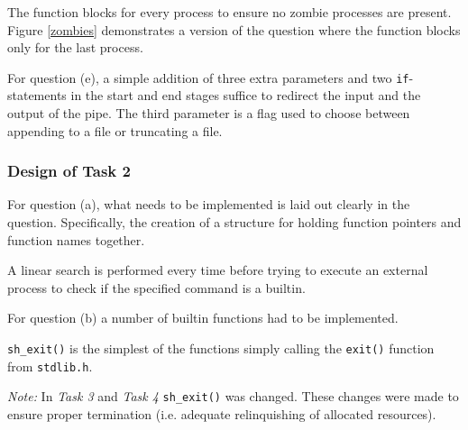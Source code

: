 \documentclass[12pt]{article}
\begin{document}
The function blocks for every process to ensure no zombie
processes are present. Figure \ref{zombies} demonstrates a
version of the question where the function blocks only for the
last process.

\newpage





For question (e), a simple addition of three extra parameters
and two \texttt{if}-statements in the start and end stages
suffice to redirect the input and the output of the pipe. The
third parameter is a flag used to choose between appending to a
file or truncating a file.

\newpage

\subsubsection{Design of Task 2}



For question (a), what needs to be implemented is laid out
clearly in the question. Specifically, the creation of a
structure for holding function pointers and function names
together. 



A linear search is performed every time before trying to execute
an external process to check if the specified command is a
builtin.

For question (b) a number of builtin functions had to be
implemented.

\texttt{sh\_exit()} is the simplest of the functions simply
calling the \texttt{exit()} function from \texttt{stdlib.h}.

\textit{Note:} In \textit{Task 3} and \textit{Task 4}
\texttt{sh\_exit()} was changed. These changes were made to
ensure proper termination (i.e. adequate relinquishing of
allocated resources).

\newpage


\end{document}
